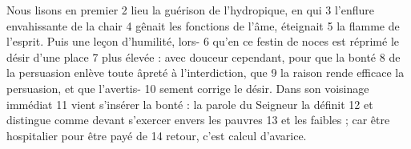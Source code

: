 Nous lisons en premier	 
2	 	lieu la guérison de l'hydropique, en qui	 
3	 	l'enflure envahissante de la chair	 
4	 	gênait les fonctions de l'âme, éteignait	 
5	 	la flamme de l'esprit. Puis une leçon d'humilité, lors-	 
6	 	qu'en ce festin de noces est réprimé le désir d'une place	 
7	 	plus élevée : avec douceur cependant, pour que la bonté	 
8	 	de la persuasion enlève toute âpreté à l'interdiction, que	 
9	 	la raison rende efficace la persuasion, et que l'avertis-	 
10	 	sement corrige le désir. Dans son voisinage immédiat	 
11	 	vient s'insérer la bonté : la parole du Seigneur la définit	 
12	 	et distingue comme devant s'exercer envers les pauvres	 
13	 	et les faibles ; car être hospitalier pour être payé de	 
14	 	retour, c'est calcul d'avarice.